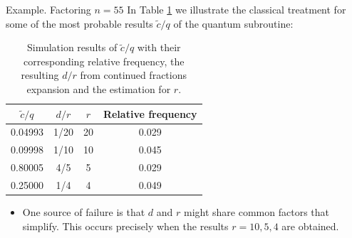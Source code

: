 \begin{frame}
    {Example. Factoring $n=55$}
	In Table \ref{tab:table} we illustrate the classical treatment for some of the most probable results $\tilde{c}/q$ of the quantum subroutine:

	\begin{table}[H]
		\centering
		\begin{tabular}{c c c c}
			\hline
			$\tilde{c}/q$ & $d/r$ & $r$ & Relative frequency  \\ 
			\hline
			0.04993 & 1/20 & 20 & 0.029 \\ 
			0.09998 & 1/10 & 10 & 0.045 \\ 
			0.80005 & 4/5  & 5  & 0.029 \\ 
			0.25000 & 1/4  & 4  & 0.049  \\ 
			\hline
		\end{tabular}
		\caption{Simulation results of $\tilde{c}/q$ with their corresponding relative frequency, the resulting $d/r$ from continued fractions expansion and the estimation for $r$.}
				\label{tab:table}
	\end{table}
	
	\begin{itemize}
		\item One source of failure is that $d$ and $r$ might share common factors that simplify. This occurs precisely when the results $r=10,5,4$ are obtained.
	\end{itemize}
\end{frame}